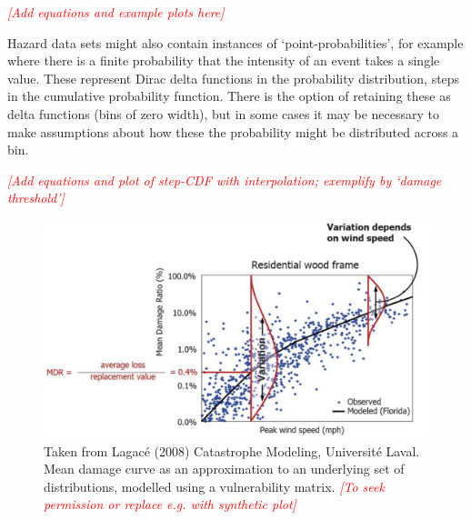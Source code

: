 \documentclass[a4paper,11pt]{extarticle} %
\begin{document}
{\textcolor{red}{\emph{[Add equations and example plots here]}}}  

Hazard data sets might also contain instances of `point-probabilities', for example where there is a finite probability that the intensity of an event takes a single value. These represent Dirac delta functions in the probability distribution, steps in the cumulative probability function. There is the option of retaining these as delta functions (bins of zero width), but in some cases it may be necessary to make assumptions about how these the probability might be distributed across a bin. 

{\textcolor{red}{\emph{[Add equations and plot of step-CDF with interpolation; exemplify by `damage threshold']}}}  

\begin{figure}[ht]
	
	\begin{framed}
		
		\includegraphics[width=\textwidth]{plots/vulnerability_lagace_2008.png}
		
	\end{framed}
	
	\footnotesize
	
	\renewcommand{\arraystretch}{1.01}
	
	\vspace{-3ex}
	
	
	\vspace{-0.5ex}
	
	\caption{\small Taken from Lagacé (2008) Catastrophe Modeling, Université Laval. Mean damage curve as an approximation to an underlying set of distributions, modelled using a vulnerability matrix. {\textcolor{red}{\emph{[To seek permission or replace e.g. with synthetic plot]}}}}
	\label{Fig:vulnerability_matrix}
	
\end{figure}
\end{document}
